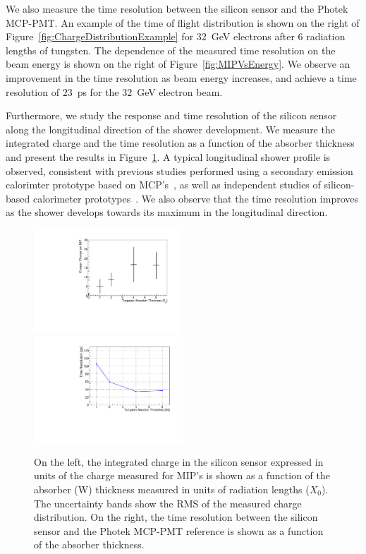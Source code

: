 \documentclass[12pt]{article}
\begin{document}
We also measure the time resolution between the silicon sensor and the Photek MCP-PMT.
An example of the time of flight distribution is shown on the right of 
Figure~\ref{fig:ChargeDistributionExample} for $32$~GeV electrons after 6 radiation
lengths of tungsten. The dependence of the measured time resolution on the beam
energy is shown on the right of Figure~\ref{fig:MIPVsEnergy}. We observe an improvement
in the time resolution as beam energy increases, and achieve a time resolution of $23$~ps
for the $32$~GeV electron beam. 

Furthermore, we study the response and time resolution of the silicon sensor
along the longitudinal direction of the shower development. We measure the
integrated charge and the time resolution as a function of the absorber thickness
and present the results in Figure~\ref{fig:MIPVsAbsorberAt8GeV}. A typical 
longitudinal shower profile is observed, consistent with previous studies performed
using a secondary emission calorimter prototype based on MCP's~\cite{MCPShowerMaxPaper},
as well as independent studies of silicon-based calorimeter prototypes~\cite{Muhuri201424}.
We also observe that the time resolution improves as the shower develops towards its 
maximum in the longitudinal direction.

\begin{figure}[htbp] 
\centering
\includegraphics[width=0.49\textwidth]{plots/MIPVsAbsorberAt8GeV.pdf} 
\includegraphics[width=0.5\textwidth]{plots/SigmaT_vs_X0_lin30Stamp.pdf} 
\caption{On the left, the integrated charge in the silicon sensor expressed in units of the 
charge measured for MIP's is shown as a function of the absorber (W) thickness measured in
units of radiation lengths ($X_{0}$). The uncertainty bands show the RMS of the measured charge 
distribution. On the right, the time resolution between the silicon 
sensor and the Photek MCP-PMT reference is shown as a function of the 
absorber thickness.
} 
\label{fig:MIPVsAbsorberAt8GeV} 
\end{figure} 
\end{document}
